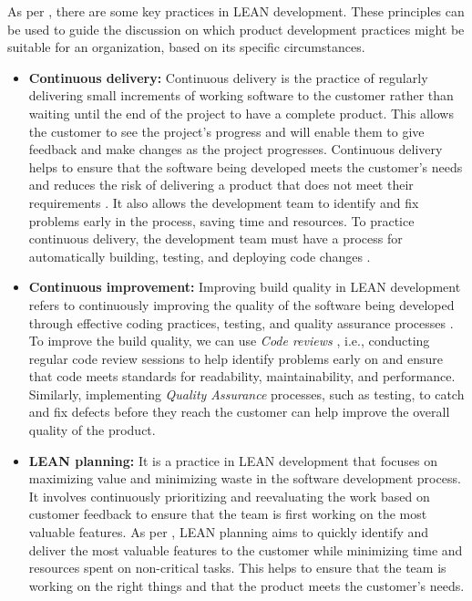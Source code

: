 As per \cite{misc:lean:tutorial}, there are some key practices in LEAN development.
These principles can be used to guide the discussion on which product development practices might be suitable for an organization, based on its specific circumstances.
\begin{itemize}
  \item[] \textbf{Continuous delivery:} Continuous delivery is the practice of regularly delivering small increments of working software to the customer rather than waiting until the end of the project to have a complete product. This allows the customer to see the project's progress and will enable them to give feedback and make changes as the project progresses. Continuous delivery helps to ensure that the software being developed meets the customer's needs and reduces the risk of delivering a product that does not meet their requirements \cite{article:lean:eric}. It also allows the development team to identify and fix problems early in the process, saving time and resources. To practice continuous delivery, the development team must have a process for automatically building, testing, and deploying code changes \cite{misc:lean:cicd}.
  \item[] \textbf{Continuous improvement:} Improving build quality in LEAN development refers to continuously improving the quality of the software being developed through effective coding practices, testing, and quality assurance processes \cite{misc:lean:cimp}. To improve the build quality, we can use \textit{Code reviews} \cite{misc:lean:tutorial}, i.e., conducting regular code review sessions to help identify problems early on and ensure that code meets standards for readability, maintainability, and performance. Similarly, implementing \textit{Quality Assurance} processes, such as testing, to catch and fix defects before they reach the customer can help improve the overall quality of the product.
  \item[] \textbf{LEAN planning:} It is a practice in LEAN development that focuses on maximizing value and minimizing waste in the software development process. It involves continuously prioritizing and reevaluating the work based on customer feedback to ensure that the team is first working on the most valuable features. As per \cite{misc:lean:planning}, LEAN planning aims to quickly identify and deliver the most valuable features to the customer while minimizing time and resources spent on non-critical tasks. This helps to ensure that the team is working on the right things and that the product meets the customer's needs. 
\end{itemize}
